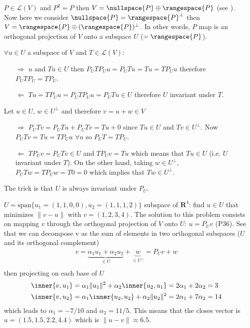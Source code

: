 \exo{} $P\in\mathcal{L}(V)$ and $P^2=P$ then $V = \nullspace{P} \oplus \rangespace{P}$ (see ). Now here we consider $\nullspace{P} = \rangespace{P}^\perp $ then 
$V = \rangespace{P} \oplus (\rangespace{P})^\perp$. In other words, $P$ map is an orthogonal projection of $V$ onto a subspace $U$ ($= \rangespace{P}$).

\exo{}


\exo{} $\forall u\in U$ a subspace of $V$ and $T\in\mathcal{L}(V)$:
\begin{itemize}
\item[$\Rightarrow$] $u$ and $Tu\in U$ then $P_UTP_Uu = P_UTu = Tu = TP_Uu$ therefore $P_UTP_U = TP_U$.
\item[$\Leftarrow$] $Tu = TP_Uu = P_U T P_Uu = P_U Tu \in U $ therefore $U$ invariant under $T$.
\end{itemize}
\exo{} Let $u\in U$, $w\in U^\perp$ and therefore $v = u+w \in V$
\begin{itemize}
\item[$\Rightarrow$] $P_UTv = P_UTu + P_UTv= Tu + 0$ since $Tu\in U$ and $Tv \in U^\perp$. Now $P_UTv = Tu = TP_U u$ $\forall u$ so $P_UT = TP_U$.
\item[$\Leftarrow$] $TP_Uv = P_UTv \in U$ and $TP_Uv = Tu$ which means that $Tu\in U$ (i.e. $U$ invariant under $T$). On the other hand, taking $w\in U^\perp$, $P_UTw = TP_Uw = T0 = 0$ which implies that $Tw\in U^\perp$. 
\end{itemize}
The trick is that $U$ is always invariant under $P_U$.

\exo{} $U=\mathrm{span}\{u_1=(1,1,0,0),u_2=(1,1,1,2)\}$ subspace of $\mathbf{R}^4$: find $u\in U$ that minimizes $\|v-u\|$ with $v=(1,2,3,4)$. 
The solution to this problem consists on mapping $v$ through the orthogonal projection of $V$ onto $U$: $u=P_Uv$ (P36). See that we can decompose v as the sum of elements in two orthogonal subspaces ($U$ and its orthogonal complement)
\begin{align*}
v = \underbrace{\alpha_1 u_1 + \alpha_2 u_2}_{\in U} + \underbrace{w}_{\in U^\perp} = P_U v + w \\
\end{align*}
then projecting on each base of $U$
\begin{align*}
\inner{v,u_1} &= \alpha_1 \|u_1\|^2 + \alpha_2 \inner{u_2,u_1} = 2\alpha_1 + 2\alpha_2 = 3 \\
\inner{v,u_2} &= \alpha_1 \inner{u_2,u_2} + \alpha_2  \|u_2\|^2 =2\alpha_1 + 7\alpha_2 = 14
\end{align*}
which leads to $\alpha_1=-7/10$ and $\alpha_2=11/5$. This means that the closes vector is $u=(1.5,1.5,2.2,4.4)$ which is $\|u-v\| \approx 6.5$.

